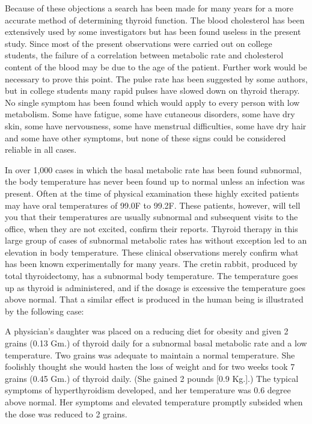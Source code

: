 \documentclass[10pt, letterpaper]{memoir}
\begin{document}
\begin{multicols}{2}
Because of these objections a search has been made for many years for a more accurate method of determining thyroid function. The blood cholesterol has been extensively used by some investigators but has been found useless in the present study. Since most of the present observations were carried out on college students, the failure of a correlation between metabolic rate and cholesterol content of the blood may be due to the age of the patient. Further work would be necessary to prove this point. The pulse rate has been suggested by some authors, but in college students many rapid pulses have slowed down on thyroid therapy. No single symptom has been found which would apply to every person with low metabolism. Some have fatigue, some have cutaneous disorders, some have dry skin, some have nervousness, some have menstrual difficulties, some have dry hair and some have other symptoms, but none of these signs could be considered reliable in all cases.

In over 1,000 cases in which the basal metabolic rate has been found subnormal, the body temperature has never been found up to normal unless an infection was present. Often at the time of physical examination these highly excited patients may have oral temperatures of 99.0\textdegree{}F to 99.2\textdegree{}F. These patients, however, will tell you that their temperatures are usually subnormal and subsequent visits to the office, when they are not excited, confirm their reports. Thyroid therapy in this large group of cases of subnormal metabolic rates has without exception led to an elevation in body temperature. These clinical observations merely confirm what has been known experimentally for many years. The cretin rabbit, produced by total thyroidectomy, has a subnormal body temperature. The temperature goes up as thyroid is administered, and if the dosage is excessive the temperature goes above normal. That a similar effect is produced in the human being is illustrated by the following case:

\begin{center}
\begin{minipage}{0.95\columnwidth}
\hspace*{1em}\small A physician's daughter was placed on a reducing diet for obesity and given 2 grains (0.13 Gm.) of thyroid daily for a subnormal basal metabolic rate and a low temperature. Two grains was adequate to maintain a normal temperature. She foolishly thought she would hasten the loss of weight and for two weeks took 7 grains (0.45 Gm.) of thyroid daily. (She gained 2 pounds [0.9 Kg.].) The typical symptoms of hyperthyroidism developed, and her temperature was 0.6 degree above normal. Her symptoms and elevated temperature promptly subsided when the dose was reduced to 2 grains.
\end{minipage}
\end{center}


\end{multicols}
\end{document}
